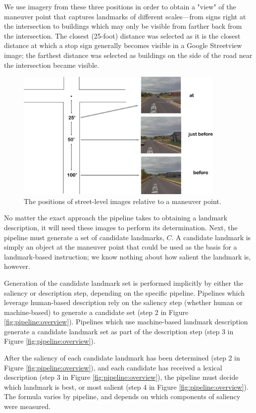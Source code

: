 We use imagery from these three positions in order to obtain a "view" of the maneuver point that captures landmarks of different scales---from signs right at the intersection to buildings which may only be visible from farther back from the intersection. The closest (25-foot) distance was selected as it is the closest distance at which a stop sign generally becomes visible in a Google Streetview image; the farthest distance was selected as buildings on the side of the road near the intersection became visible.

\begin{figure}[htbp]
  \centering
  \includegraphics[width=0.9\textwidth]{images/sv.pdf}
  \caption{The positions of street-level images relative to a maneuver point.}
  \label{fig:sv}
\end{figure}

No matter the exact approach the pipeline takes to obtaining a landmark description, it will need these images to perform its determination. Next, the pipeline must generate a set of candidate landmarks, $C$. A candidate landmark is simply an object at the maneuver point that could be used as the basis for a landmark-based instruction; we know nothing about how salient the landmark is, however. 
	
Generation of the candidate landmark set is performed implicitly by either the saliency or description step, depending on the specific pipeline. Pipelines which leverage human-based description rely on the saliency step (whether human or machine-based) to generate a candidate set (step 2 in Figure \ref{fig:pipeline:overview}). Pipelines which use machine-based landmark description generate a candidate landmark set as part of the description step (step 3 in Figure \ref{fig:pipeline:overview}).

After the saliency of each candidate landmark has been determined (step 2 in Figure \ref{fig:pipeline:overview}), and each candidate has received a lexical description (step 3 in Figure \ref{fig:pipeline:overview}), the pipeline must decide which landmark is best, or most salient (step 4 in Figure \ref{fig:pipeline:overview}). The formula varies by pipeline, and depends on which components of saliency were measured.


